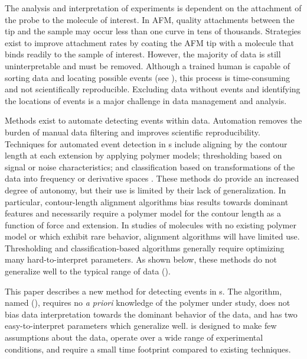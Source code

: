 The analysis and interpretation of \singlemol{} experiments is dependent on the attachment of the probe to the molecule of interest. In AFM, quality attachments between the tip and the sample may occur less than one curve in tens of thousands. Strategies exist to improve attachment rates by coating the AFM tip with a molecule that binds readily to the sample of interest.\cite{walder_robert_rapid_nodate} However, the majority of data is still uninterpretable and must be removed. Although a trained human is capable of sorting \singlemol{} data and locating possible events (see ), this process is time-consuming and not scientifically reproducible. Excluding data without events and identifying the locations of events is a major challenge in \singlemol{} data management and analysis.

Methods exist to automate detecting events within \singlemol{} data. Automation removes the burden of manual data filtering and improves scientific reproducibility. Techniques for automated event detection in \fec{}s include aligning by the contour length at each extension by applying polymer models; thresholding based on signal or noise characteristics; and classification based on transformations of the data into frequency or derivative spaces . These methods do provide an increased degree of autonomy, but their use is limited by their lack of generalization. In particular, contour-length alignment algorithms bias results towards dominant features and necessarily require a polymer model for the contour length as a function of force and extension. In \singlemol{} studies of molecules with no existing polymer model or which exhibit rare behavior, alignment algorithms will have limited use.  Thresholding and classification-based algorithms generally require optimizing many hard-to-interpret parameters. As shown below, these methods do not generalize well to the typical range of \singlemol{} data ().

This paper describes a new method for detecting events in \fec{}s.  The algorithm, named \name{} (\acronym{}), requires no \textit{a priori} knowledge of the polymer under study, does not bias data interpretation towards the dominant behavior of the data, and has two easy-to-interpret parameters which generalize well. \name{} is designed to make few assumptions about the data, operate over a wide range of \singlemol{} experimental conditions, and require a small time footprint compared to existing techniques.

